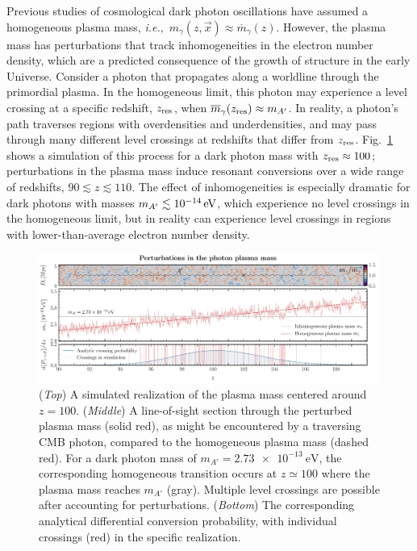 \documentclass[prd,aps,10pt,nofootinbib,twocolumn,superscriptaddress,preprintnumbers,balancelastpage,longbibliography]{revtex4-1}
\begin{document}
Previous studies of cosmological dark photon oscillations have assumed a homogeneous plasma mass, \emph{i.e.},\ $m_\gamma(z, \vec x) \approx \overline {m}_\gamma(z)$.  However, the plasma mass has perturbations that track inhomogeneities in the electron number density, which are a predicted consequence of the growth of structure in the early Universe.  Consider a photon that propagates along a worldline through the primordial plasma.  In the homogeneous limit, this photon may experience a level crossing at a specific redshift, $z_{\rm res}$, when $\overline {m}_\gamma(z_{\rm res}) \approx m_{A^\prime}$.   In reality, a photon's path traverses regions with overdensities and underdensities, and may pass through many different level crossings at redshifts that differ from $z_{\rm res}$. Fig.~\ref{fig:simulations} shows a simulation of this process for a dark photon mass with $z_{\rm res} \approx 100$; perturbations in the plasma mass induce resonant conversions over a wide range of redshifts, $90 \lesssim z \lesssim 110$.  The effect of inhomogeneities is especially dramatic for dark photons with masses $\mAp \lesssim \SI{e-14}{\eV}$, which experience no level crossings in the homogeneous limit, but in reality can experience level crossings in regions with lower-than-average electron number density.

%
\begin{figure}[htbp]
    \centering
    \includegraphics[width=0.99\textwidth]{plots/perturbations.pdf}
    \caption{
    ({\it Top}) A simulated realization of the plasma mass centered around $z=100$.  ({\it Middle}) A line-of-sight section through the perturbed plasma mass (solid red), as might be encountered by a traversing CMB photon, compared to the homogeneous plasma mass (dashed red). For a dark photon mass of $m_{A'} = \SI{2.73e-13}{\eV}$, the corresponding homogeneous transition occurs at $z\simeq 100$ where the plasma mass reaches $m_{A'}$ (gray). Multiple level crossings 
    are possible after accounting for perturbations. ({\it Bottom}) The corresponding analytical differential conversion probability, with individual crossings (red) in the specific realization.~
    }
    \label{fig:simulations}
\end{figure}
%
\end{document}

